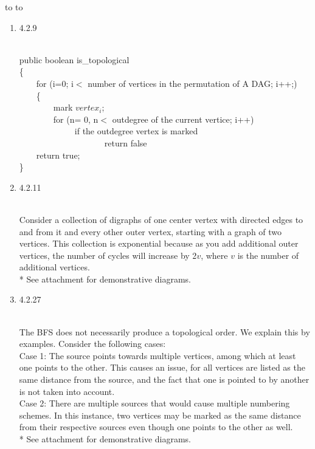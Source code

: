 \documentclass[11pt]{article}
\newcommand{\handout}{
   \renewcommand{\thepage}{H\hnumber-\arabic{page}}
   \noindent
   \begin{center}
      \vbox{
    \hbox to \columnwidth {\sc{\course} --- \prof \hfill}
    \vspace{-2mm}
    \hbox to \columnwidth {\sc due \MakeLowercase{\duedate} \duelocation\hfill {\Huge\color{mdb}H\hnumber.}}
	\vspace{15pt}
	{\Huge\yourname}
      }
   \end{center}
   \vspace*{2mm}
}
\begin{document}
\thispagestyle{empty}
\handout

\begin{enumerate}

\item 4.2.9
\begin{solution}\\
public boolean is\_topological\\
\{ \\
\-\ \-\ \-\ \-\ for (i=0; i$<$ number of vertices in the permutation of A DAG; i++;) \\
 \-\ \-\ \-\ \-\ \{\\
\-\ \-\ \-\ \-\ \-\ \-\ \-\ \-\ mark $vertex_i$;\\
\-\ \-\ \-\ \-\ \-\ \-\ \-\ \-\ for (n= 0, n$<$ outdegree of the current vertice; i++)\\\
\-\ \-\ \-\ \-\ \-\ \-\ \-\ \-\ \-\ \-\ \-\ \-\ if the outdegree vertex is marked\\
\-\ \-\ \-\ \-\ \-\ \-\ \-\ \-\ \-\ \-\ \-\ \-\ \-\ \-\ \-\ \-\ \-\ \-\ \-\ \-\ return false\\
\-\ \-\ \-\ \-\ return true;\\
\}\\
\end{solution}

\item 4.2.11
\begin{solution}\\
Consider a collection of digraphs of one center vertex with directed edges to and from it and every other outer vertex, starting with a graph of two vertices. This collection is exponential because as you add additional outer vertices, the number of cycles will increase by 2$v$, where $v$ is the number of additional vertices. \\
* See attachment for demonstrative diagrams.
\end{solution}

\item 4.2.27
\begin{solution}\\
The BFS does not necessarily produce a topological order. We explain this by examples. Consider the following cases:\\
Case 1: The source points towards multiple vertices, among which at least one points to the other. This causes an issue, for all vertices are listed as the same distance from the source, and the fact that one is pointed to by another is not taken into account.\\
Case 2: There are multiple sources that would cause multiple numbering schemes. In this instance, two vertices may be marked as the same distance from their respective sources even though one points to the other as well. \\
* See attachment for demonstrative diagrams.
\end{solution}


\end{enumerate}
\end{document}
